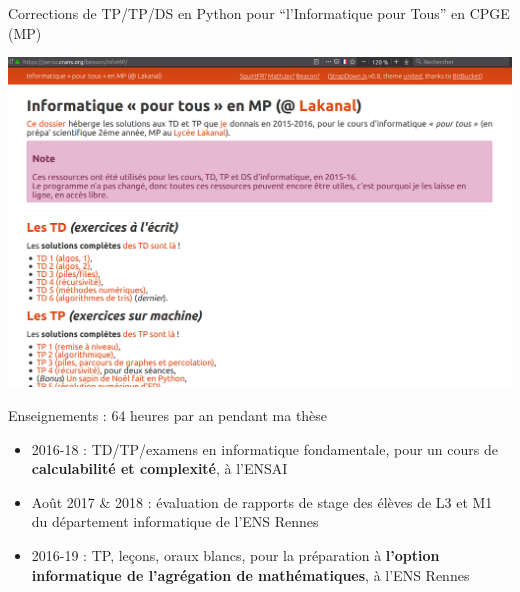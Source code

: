 \documentclass[11pt,english,ignorenonframetext,]{beamer}
\providecommand{\tightlist}{%
  \setlength{\itemsep}{0pt}\setlength{\parskip}{0pt}}
\begin{document}
\begin{frame}[plain]{Corrections de TP/TP/DS \textcolor{info}{en Python pour ``l'Informatique pour Tous''} en CPGE (MP)}

\centering
\includegraphics{figures/apercu_Lakanal.png}

\end{frame}


\begin{frame}{Enseignements : \(64 \) heures par an pendant ma thèse}

\begin{itemize}[<+->]
\item
  2016-18 : TD/TP/examens en \textcolor{info}{informatique fondamentale}, pour un cours de \textbf{calculabilité et complexité}, à l'ENSAI
\vspace*{15pt}
\item
  Août 2017 \& 2018 : évaluation de rapports de stage des élèves de L3 et M1 du \textcolor{info}{département informatique} de l'ENS Rennes
\vspace*{15pt}
\item
  2016-19 : TP, leçons, oraux blancs, pour la
  préparation à \textbf{\textcolor{info}{l'option informatique} de \textcolor{maths}{l'agrégation de mathématiques}}, à l'ENS Rennes
\end{itemize}

\end{frame}
\end{document}

